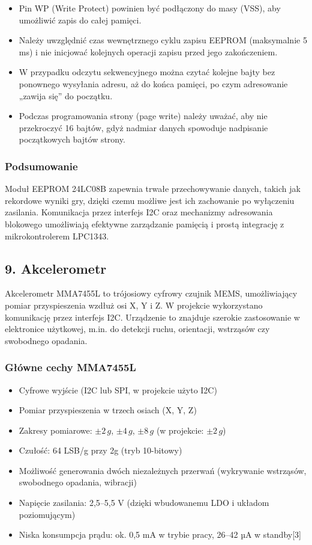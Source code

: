 \documentclass[a4paper,12pt]{report}
\begin{document}
\begin{itemize}
    \item Pin WP (Write Protect) powinien być podłączony do masy (VSS), aby umożliwić zapis do całej pamięci.
    \item Należy uwzględnić czas wewnętrznego cyklu zapisu EEPROM (maksymalnie 5 ms) i nie inicjować kolejnych operacji zapisu przed jego zakończeniem.
    \item W przypadku odczytu sekwencyjnego można czytać kolejne bajty bez ponownego wysyłania adresu, aż do końca pamięci, po czym adresowanie „zawija się” do początku.
    \item Podczas programowania strony (page write) należy uważać, aby nie przekroczyć 16 bajtów, gdyż nadmiar danych spowoduje nadpisanie początkowych bajtów strony.
\end{itemize}

\subsubsection*{Podsumowanie}

Moduł EEPROM 24LC08B zapewnia trwałe przechowywanie danych, takich jak rekordowe wyniki gry, dzięki czemu możliwe jest ich zachowanie po wyłączeniu zasilania. Komunikacja przez interfejs I2C oraz mechanizmy adresowania blokowego umożliwiają efektywne zarządzanie pamięcią i prostą integrację z mikrokontrolerem LPC1343.

\subsection*{9. Akcelerometr}

Akcelerometr MMA7455L to trójosiowy cyfrowy czujnik MEMS, umożliwiający pomiar przyspieszenia wzdłuż osi X, Y i Z. W projekcie wykorzystano komunikację przez interfejs I2C. Urządzenie to znajduje szerokie zastosowanie w elektronice użytkowej, m.in. do detekcji ruchu, orientacji, wstrząsów czy swobodnego opadania.

\subsubsection*{Główne cechy MMA7455L}

\begin{itemize}
    \item Cyfrowe wyjście (I2C lub SPI, w projekcie użyto I2C)
    \item Pomiar przyspieszenia w trzech osiach (X, Y, Z)
    \item Zakresy pomiarowe: \(\pm2\,g\), \(\pm4\,g\), \(\pm8\,g\) (w projekcie: \(\pm2\,g\))
    \item Czułość: 64 LSB/g przy 2g (tryb 10-bitowy)
    \item Możliwość generowania dwóch niezależnych przerwań (wykrywanie wstrząsów, swobodnego opadania, wibracji)
    \item Napięcie zasilania: 2,5–5,5 V (dzięki wbudowanemu LDO i układom poziomującym)
    \item Niska konsumpcja prądu: ok. 0,5 mA w trybie pracy, 26–42 µA w standby[3]
\end{itemize}
\end{document}
